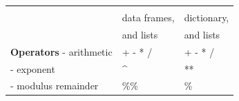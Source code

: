 \documentclass[]{book}
\theoremstyle{definition}
\theoremstyle{definition}
\theoremstyle{definition}
\theoremstyle{remark}
\begin{document}
\begin{longtable}[]{@{}lll@{}}
\begin{minipage}[t]{0.39\columnwidth}
\strut
\end{minipage}\tabularnewline
\begin{minipage}[t]{0.19\columnwidth}\raggedright\strut
\strut
\end{minipage} & \begin{minipage}[t]{0.33\columnwidth}\raggedright\strut
data frames,\strut
\end{minipage} & \begin{minipage}[t]{0.39\columnwidth}\raggedright\strut
dictionary,\strut
\end{minipage}\tabularnewline
\begin{minipage}[t]{0.19\columnwidth}\raggedright\strut
\strut
\end{minipage} & \begin{minipage}[t]{0.33\columnwidth}\raggedright\strut
and lists\strut
\end{minipage} & \begin{minipage}[t]{0.39\columnwidth}\raggedright\strut
and lists\strut
\end{minipage}\tabularnewline
\begin{minipage}[t]{0.19\columnwidth}\raggedright\strut
\textbf{Operators} - arithmetic\strut
\end{minipage} & \begin{minipage}[t]{0.33\columnwidth}\raggedright\strut
+ - * /\strut
\end{minipage} & \begin{minipage}[t]{0.39\columnwidth}\raggedright\strut
+ - * /\strut
\end{minipage}\tabularnewline
\begin{minipage}[t]{0.19\columnwidth}\raggedright\strut
- exponent\strut
\end{minipage} & \begin{minipage}[t]{0.33\columnwidth}\raggedright\strut
\^{}\strut
\end{minipage} & \begin{minipage}[t]{0.39\columnwidth}\raggedright\strut
**\strut
\end{minipage}\tabularnewline
\begin{minipage}[t]{0.19\columnwidth}\raggedright\strut
- modulus remainder\strut
\end{minipage} & \begin{minipage}[t]{0.33\columnwidth}\raggedright\strut
\%\%\strut
\end{minipage} & \begin{minipage}[t]{0.39\columnwidth}\raggedright\strut
\%\strut
\end{minipage}\tabularnewline

\end{longtable}
\end{document}
